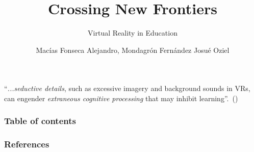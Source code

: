 \documentclass[aspectratio=169]{beamer}
\title[VR in Education]{Crossing New Frontiers}
\subtitle{Virtual Reality in Education}
\author{Macías Fonseca Alejandro, Mondagrón Fernández Josué Oziel}
\institute[FIF UAQ]{Facultad de Informática \\ Universidad Autónoma de Querétaro }
\begin{document}
\begin{frame}
      \huge “\textit{...seductive details}, such as excessive imagery and background sounds in VRs, can engender \textit{extraneous cognitive processing} that may inhibit learning”.~(\cite{OJE2023100033})
   \end{frame}
\frame{\titlepage}
\begin{frame}
   \frametitle{Table of contents}
   \tableofcontents
\end{frame}
\begin{frame}
   \frametitle{References}
   \printbibliography
\end{frame}
\end{document}
